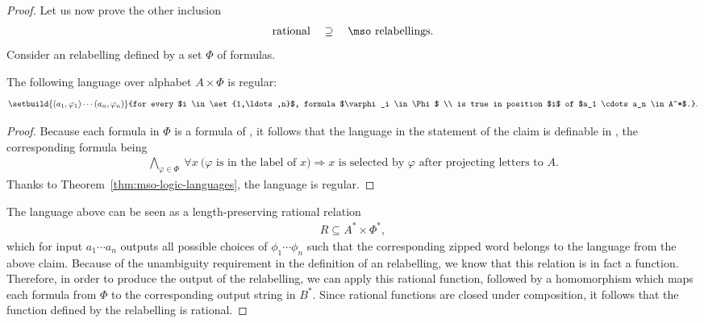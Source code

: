 \begin{proof}
Let us now prove the other inclusion
\begin{align*}
    \text{rational} \quad \supseteq \quad \text{\mso relabellings.}
    \end{align*}
    Consider an \mso relabelling defined by a set $\Phi$ of formulas. 
    
\begin{claim}\label{claim:mso-annotation-regular}
    The following language over alphabet $A \times \Phi$ is regular:
\begin{align*}
    \setbuild{ (a_1,\varphi_1) \cdots (a_n,\varphi_n)}{for every $i \in \set{1,\ldots,n}$,  formula $\varphi_i \in \Phi$ \\  is true in position $i$ of $a_1 \cdots a_n \in A^*$.}.
\end{align*}
\end{claim}
\begin{proof}
    Because each formula in $\Phi$ is a formula of \mso, it follows that the language in the statement of the claim is definable in \mso, the corresponding formula being
    \begin{align*}
    \bigwedge_{\varphi \in \Phi} \ \forall x  \ \text{($\varphi$ is in the label of $x$)} \Rightarrow \text{$x$ is selected by $\varphi$ after projecting letters to $A$}.
    \end{align*}
    Thanks to Theorem~\ref{thm:mso-logic-languages}, the language is regular.
\end{proof}

The language above can be seen as a length-preserving rational relation 
\begin{align*}
R \subseteq A^* \times \Phi^*,
\end{align*}
which for input $a_1 \cdots a_n$ outputs all possible choices of $\phi_1 \cdots \phi_n$ such that the corresponding zipped word belongs to the language from the above claim. Because of the unambiguity requirement in the definition of an \mso relabelling, we know that this relation is in fact a function. Therefore, in order to produce the output of the \mso relabelling, we can apply this rational function, followed by a homomorphism which maps each formula from $\Phi$ to the corresponding output string in $B^*$. Since rational functions are closed under composition, it follows that the function defined by the \mso relabelling is rational.
\end{proof}

\exerciseheader

